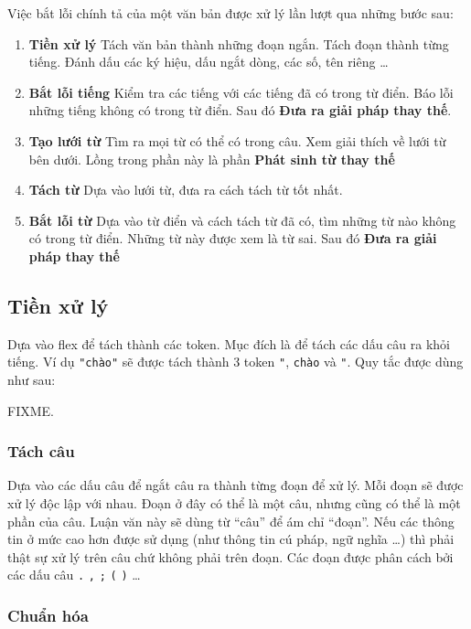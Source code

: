 \documentclass[a4paper]{book} %
\begin{document}
Việc bắt lỗi chính tả của một văn bản được xử lý lần lượt qua những
bước sau:
\begin{enumerate}
\item \textbf{Tiền xử lý} Tách văn bản thành những đoạn ngắn. Tách
  đoạn thành từng tiếng. Đánh dấu các ký hiệu, dấu ngắt dòng, các số,
  tên riêng \ldots
\item \textbf{Bắt lỗi tiếng} Kiểm tra các tiếng với các tiếng đã có
  trong từ điển. Báo lỗi những tiếng không có trong từ điển. Sau đó 
  \textbf{Đưa ra giải pháp thay thế}.
\item \textbf{Tạo lưới từ} Tìm ra mọi từ có thể có trong câu. Xem
  giải thích về lưới từ bên dưới. Lồng trong phần này là phần
  \textbf{Phát sinh từ thay thế}
\item \textbf{Tách từ} Dựa vào lưới từ, đưa ra cách tách từ tốt nhất.
\item \textbf{Bắt lỗi từ} Dựa vào từ điển và cách tách từ đã có,
  tìm những từ nào không có trong từ điển. Những từ này được xem là từ
  sai. Sau đó \textbf{Đưa ra giải pháp thay thế}
\end{enumerate}

\subsection{Tiền xử lý}
\label{sub:preprocess}

Dựa vào flex để tách thành các token. Mục đích là để tách các dấu câu
ra khỏi tiếng. Ví dụ \verb#"chào"# sẽ được tách thành 3 token
\verb#"#, \verb#chào# và \verb#"#. Quy tắc được dùng như sau:

FIXME.

\subsubsection{Tách câu}

Dựa vào các dấu câu để ngắt câu ra thành từng đoạn để xử lý. Mỗi
đoạn sẽ được xử lý độc lập với nhau. Đoạn ở đây có thể là một câu,
nhưng cũng có thể là một 
phần của câu. Luận văn này sẽ dùng từ ``câu'' để ám chỉ ``đoạn''. Nếu
các thông tin ở mức cao hơn được sử dụng (như thông tin cú pháp, ngữ
nghĩa \ldots) thì phải thật sự xử lý trên câu chứ không phải trên
đoạn. Các đoạn được phân cách bởi các dấu câu \verb#.# \verb#,#
\verb#;# \verb#(# \verb#)# \ldots 

\subsubsection{Chuẩn hóa}
\end{document}

